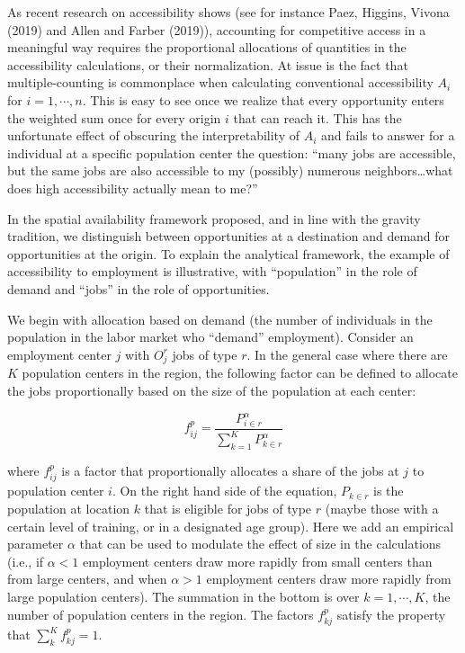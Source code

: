 \documentclass[]{elsarticle} %
\begin{document}
As recent research on accessibility shows (see for instance Paez,
Higgins, Vivona (2019) and Allen and Farber (2019)), accounting for
competitive access in a meaningful way requires the proportional
allocations of quantities in the accessibility calculations, or their
normalization. At issue is the fact that multiple-counting is
commonplace when calculating conventional accessibility \(A_i\) for
\(i=1,\cdots,n\). This is easy to see once we realize that every
opportunity enters the weighted sum once for every origin \(i\) that can
reach it. This has the unfortunate effect of obscuring the
interpretability of \(A_i\) and fails to answer for a individual at a
specific population center the question: ``many jobs are accessible, but
the same jobs are also accessible to my (possibly) numerous
neighbors\ldots what does high accessibility actually mean to me?''

In the spatial availability framework proposed, and in line with the
gravity tradition, we distinguish between opportunities at a destination
and demand for opportunities at the origin. To explain the analytical
framework, the example of accessibility to employment is illustrative,
with ``population'' in the role of demand and ``jobs'' in the role of
opportunities.

We begin with allocation based on demand (the number of individuals in
the population in the labor market who ``demand'' employment). Consider
an employment center \(j\) with \(O_j^r\) jobs of type \(r\). In the
general case where there are \(K\) population centers in the region, the
following factor can be defined to allocate the jobs proportionally
based on the size of the population at each center:

\[
f^p_{ij} = \frac{P_{i\in r}^\alpha}{\sum_{k=1}^K P_{k\in r}^\alpha}
\]

\noindent where \(f^p_{ij}\) is a factor that proportionally allocates a
share of the jobs at \(j\) to population center \(i\). On the right hand
side of the equation, \(P_{k\in r}\) is the population at location \(k\)
that is eligible for jobs of type \(r\) (maybe those with a certain
level of training, or in a designated age group). Here we add an
empirical parameter \(\alpha\) that can be used to modulate the effect
of size in the calculations (i.e., if \(\alpha <1\) employment centers
draw more rapidly from small centers than from large centers, and when
\(\alpha>1\) employment centers draw more rapidly from large population
centers). The summation in the bottom is over \(k=1,\cdots,K\), the
number of population centers in the region. The factors \(f_{kj}^p\)
satisfy the property that \(\sum_k^{K} f^p_{kj} = 1\).
\end{document}
